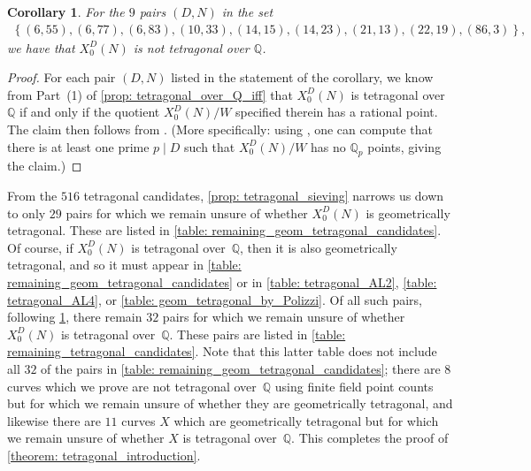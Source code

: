 \documentclass[11pt,reqno]{amsart}
\newcommand{\Q}{\mathbb{Q}}
\newtheorem{corollary}[theorem]{Corollary}
\theoremstyle{definition}
\begin{document}
\begin{corollary}\label{not_tetragonal_cor}
For the $9$ pairs $(D,N)$ in the set 
\begin{align*}
    \left \{(6,55), (6,77), (6,83), (10,33), (14,15), (14,23), (21, 13), (22, 19), (86,3) \right\},
\end{align*}
we have that $X_0^D(N)$ is not tetragonal over $\Q$.
\end{corollary}
\begin{proof}
For each pair $(D,N)$ listed in the statement of the corollary, we know from  Part~(1) of \cref{prop: tetragonal_over_Q_iff} that $X_0^D(N)$ is tetragonal over $\Q$ if and only if the quotient $X_0^D(N)/W$ specified therein has a rational point. The claim then follows from \cite[Corollary~1.3]{PS25b}. (More specifically: using \cite[Algorithm~3.3]{PS25b}, one can compute that there is at least one prime $p \mid D$ such that $X_0^D(N)/W$ has no $\Q_p$ points, giving the claim.) 
\end{proof}

From the $516$ tetragonal candidates, \cref{prop: tetragonal_sieving} narrows us down to only $29$ pairs for which we remain unsure of whether $X_0^D(N)$ is geometrically tetragonal. These are listed in \cref{table: remaining_geom_tetragonal_candidates}. Of course, if $X_0^D(N)$ is tetragonal over~$\Q$, then it is also geometrically tetragonal, and so it must appear in \cref{table: remaining_geom_tetragonal_candidates} or in \cref{table: tetragonal_AL2}, \cref{table: tetragonal_AL4}, or \cref{table: geom_tetragonal_by_Polizzi}. Of all such pairs, following \cref{not_tetragonal_cor}, there remain $32$ pairs for which we remain unsure of whether $X_0^D(N)$ is tetragonal over~$\Q$. These pairs are listed in \cref{table: remaining_tetragonal_candidates}. Note that this latter table does not include all $32$ of the pairs in \cref{table: remaining_geom_tetragonal_candidates}; there are $8$ curves which we prove are not tetragonal over~$\Q$ using finite field point counts but for which we remain unsure of whether they are geometrically tetragonal, and likewise there are $11$ curves $X$ which are geometrically tetragonal but for which we remain unsure of whether $X$ is tetragonal over~$\Q$. This completes the proof of \cref{theorem: tetragonal_introduction}.
\end{document}
